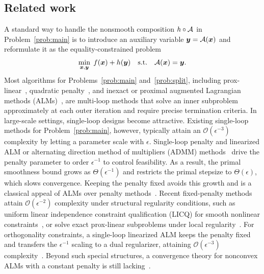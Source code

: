 \subsection{Related work}
A standard way to handle the nonsmooth composition \(h\circ\mathcal{A}\) in
Problem~\eqref{prob:main} is to introduce an auxiliary variable \(\bm{y}=\mathcal{A}(\bm{x})\)
and reformulate it as the equality-constrained problem
\begin{equation}\label{prob:split}
  \min_{\bm{x},\bm{y}}\; f(\bm{x})+h(\bm{y})\quad\text{s.t.}\quad \mathcal{A}(\bm{x})=\bm{y}.
\end{equation}
Most algorithms for Problems~\eqref{prob:main} and~\eqref{prob:split}, including
prox-linear~\cite{Drusvyatskiy2019,burke1985descent,lewis2016proximal},
quadratic penalty~\cite{kong2019complexity,lin2022complexity}, and inexact or
proximal augmented Lagrangian methods
(ALMs)~\cite{sahin2019inexact,li2021rate,xie2021proximal}, are
multi-loop methods that solve an inner subproblem approximately at each outer
iteration and require precise termination criteria. In large-scale settings,
single-loop designs become attractive. Existing
single-loop methods for Problem~\eqref{prob:main}, however, typically
attain an \(\mathcal O(\epsilon^{-3})\) complexity by letting a parameter
scale with \(\epsilon\). Single-loop penalty and linearized ALM or alternating direction method of
multipliers (ADMM) 
methods~\cite{luSingleLoopGradientDescent2022,sun2024dual_descent_alm_admm,elbourkhissi2025perturbed}
drive the penalty parameter to order \(\epsilon^{-1}\) to
control feasibility. As a result, the primal smoothness bound grows as
\(\Theta(\epsilon^{-1})\) and restricts the primal stepsize to
\(\Theta(\epsilon)\), which slows convergence. Keeping the penalty 
fixed avoids this growth and is a classical appeal of ALMs over penalty
methods~\cite{bertsekas1982,nocedal2006numerical}. Recent fixed-penalty
methods attain \(\mathcal O(\epsilon^{-2})\) complexity under
structural regularity conditions, such as uniform linear independence
constraint qualification (LICQ) for smooth nonlinear
constraints~\cite{elbourkhissi2025linearized,liu2026fixed}, or solve exact
prox-linear subproblems under local regularity~\cite{zhu2026nonconvex}. For
orthogonality constraints, a single-loop linearized ALM keeps the penalty
fixed and transfers the \(\epsilon^{-1}\) scaling to a dual regularizer,
attaining \(\mathcal O(\epsilon^{-3})\) complexity~\cite{zhu2026primal}. Beyond such special structures, a
convergence theory for nonconvex ALMs with a constant penalty is still
lacking~\cite{deng2026augmented}.


